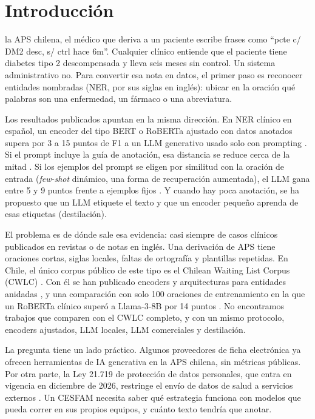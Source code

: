 \documentclass[10pt,journal,a4paper]{IEEEtran}
\begin{document}
\section{Introducci\'on}\label{sec:intro}

 la APS chilena, el médico que deriva a un paciente escribe frases como ``pcte c/ DM2 desc, s/ ctrl hace 6m''. Cualquier clínico entiende que el paciente tiene diabetes tipo 2 descompensada y lleva seis meses sin control. Un sistema administrativo no. Para convertir esa nota en datos, el primer paso es reconocer entidades nombradas (NER, por sus siglas en inglés): ubicar en la oración qué palabras son una enfermedad, un fármaco o una abreviatura.

Los resultados publicados apuntan en la misma dirección. En NER clínico en español, un encoder del tipo BERT o RoBERTa ajustado con datos anotados supera por 3 a 15 puntos de F1 a un LLM generativo usado solo con prompting \cite{naguib2024,chen2025}. Si el prompt incluye la guía de anotación, esa distancia se reduce cerca de la mitad \cite{hu2024}. Si los ejemplos del prompt se eligen por similitud con la oración de entrada (\emph{few-shot} dinámico, una forma de recuperación aumentada), el LLM gana entre 5 y 9 puntos frente a ejemplos fijos \cite{ge2026}. Y cuando hay poca anotación, se ha propuesto que un LLM etiquete el texto y que un encoder pequeño aprenda de esas etiquetas (destilación).

El problema es de dónde sale esa evidencia: casi siempre de casos clínicos publicados en revistas o de notas en inglés. Una derivación de APS tiene oraciones cortas, siglas locales, faltas de ortografía y plantillas repetidas. En Chile, el único corpus público de este tipo es el Chilean Waiting List Corpus (CWLC) \cite{baez2020,baez2022}. Con él se han publicado encoders y arquitecturas para entidades anidadas \cite{rojas2022coling,rojas2022louhi,rojas2022flair}, y una comparación con solo 100 oraciones de entrenamiento en la que un RoBERTa clínico superó a Llama-3-8B por 14 puntos \cite{naguib2024}. No encontramos trabajos que comparen con el CWLC completo, y con un mismo protocolo, encoders ajustados, LLM locales, LLM comerciales y destilación.

La pregunta tiene un lado práctico. Algunos proveedores de ficha electrónica ya ofrecen herramientas de IA generativa en la APS chilena, sin métricas públicas. Por otra parte, la Ley 21.719 de protección de datos personales, que entra en vigencia en diciembre de 2026, restringe el envío de datos de salud a servicios externos \cite{ley21719}. Un CESFAM necesita saber qué estrategia funciona con modelos que pueda correr en sus propios equipos, y cuánto texto tendría que anotar.
\end{document}
